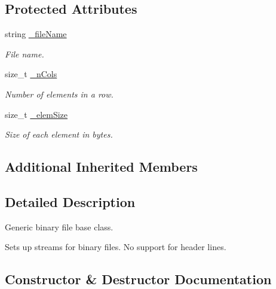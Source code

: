 \subsection*{Protected Attributes}
\begin{DoxyCompactItemize}
\item 
\mbox{\label{classsamp_files_1_1_gbin_file_a14d7824f305dc27e39fa62fc25af3a15}} 
string \hyperlink{classsamp_files_1_1_gbin_file_a14d7824f305dc27e39fa62fc25af3a15}{\+\_\+file\+Name}
\begin{DoxyCompactList}\small\item\em File name. \end{DoxyCompactList}\item 
\mbox{\label{classsamp_files_1_1_gbin_file_a3812c4ed2ddc7554dec1bae48905b9fe}} 
size\+\_\+t \hyperlink{classsamp_files_1_1_gbin_file_a3812c4ed2ddc7554dec1bae48905b9fe}{\+\_\+n\+Cols}
\begin{DoxyCompactList}\small\item\em Number of elements in a row. \end{DoxyCompactList}\item 
\mbox{\label{classsamp_files_1_1_gbin_file_ad3d585c1160916f60bde3fdd17a077ef}} 
size\+\_\+t \hyperlink{classsamp_files_1_1_gbin_file_ad3d585c1160916f60bde3fdd17a077ef}{\+\_\+elem\+Size}
\begin{DoxyCompactList}\small\item\em Size of each element in bytes. \end{DoxyCompactList}\end{DoxyCompactItemize}
\subsection*{Additional Inherited Members}


\subsection{Detailed Description}
Generic binary file base class. 

Sets up streams for binary files. No support for header lines. 

\subsection{Constructor \& Destructor Documentation}
\mbox{\label{classsamp_files_1_1_gbin_file_ac88b766b15e644506fa4bca84a650f3b}} 
